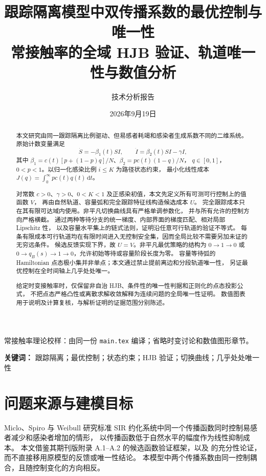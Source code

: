 \documentclass[11pt,a4paper,UTF8]{ctexart}
\title{\bfseries 跟踪隔离模型中双传播系数的最优控制与唯一性\\[2mm]
\large 常接触率的全域 HJB 验证、轨道唯一性与数值分析}
\author{技术分析报告}
\date{2026年9月19日}
\theoremstyle{definition}
\newcommand{\dd}{\,\mathrm d}
\begin{document}
\maketitle
\ifdefined\TheoryOnly
\begin{center}\small 常接触率理论校样：由同一份 \texttt{main.tex} 编译；省略时变讨论和数值图形章节。\end{center}
\fi
\begin{abstract}
本文研究由同一跟踪隔离比例驱动、但易感者耗竭和感染者生成系数不同的二维系统。
原始计数变量满足
\[
\dot S=-\beta_1(t)SI,\qquad \dot I=\beta_2(t)SI-\gamma I,
\]
其中 $\beta_1=c(t)[p+(1-p)q]/N$、$\beta_2=pc(t)(1-q)/N$，
$q\in[0,1]$，$0<p<1$。以归一化感染比例 $i\le K$ 为路径状态约束，
最小化线性成本 $J(q)=\int_0^\infty pc(t)q(t)\dd t$。

对常数 $c>0$、$\gamma>0$、$0<K<1$ 及正感染初值，本文先定义所有可测可行控制上的值函数 $V$，
再由自然轨道、容量弧和完全跟踪特征线构造候选成本 $U$。
完全跟踪成本只在其有限可达域内使用。非平凡切换曲线具有严格单调参数化，
并与所有允许的控制方向严格横截。
通过两种等待分支的统一梯度、内部界面的梯度匹配、相对局部 Lipschitz 性，
以及容量水平集上的链式法则，证明沿任意可行轨道的验证不等式。
每条有限成本可行轨道均在有限时间进入无控制安全集，因而全局比较不需要另加未证的无穷远条件。
候选反馈实现下界，故 $U=V$。非平凡最优策略的结构为
$0\to1\to0$ 或 $0\to q_B(s)\to1\to0$，允许初始等待或容量阶段长度为零。
容量等待弧的 Hamiltonian 点态极小集并非单点；本文通过禁止提前离边和分段轨道唯一性，
另证最优控制在全时间轴上几乎处处唯一。

给定时变接触率时，仅保留非自治 HJB、条件性的唯一性判据和正则化的点态投影公式，
不把点态严格凸性或离散求解收敛解释为连续问题的全局唯一性证明。
数值图表用于说明及计算复核，与解析证明的证据范围分别陈述。
\end{abstract}
\noindent\textbf{关键词：} 跟踪隔离；最优控制；状态约束；HJB 验证；切换曲线；几乎处处唯一性
\tableofcontents\newpage

\section{问题来源与建模目标}
\label{sec:model}
Miclo、Spiro 与 Weibull 研究标准 SIR 约化系统中同一个传播函数同时控制易感者减少和感染者增加的情形，
以传播函数低于自然水平的幅度作为线性抑制成本\citep{MicloSpiroWeibull2022}。
本文借鉴其期刊版附录 A.1--A.2 的候选函数验证框架，以及
\citet[\S5.1.4]{Liberzon2012} 的充分性论证，而不直接移用原模型的反馈或唯一性结论。
本模型中两个传播系数由同一控制耦合，且随控制变化的方向相反。
\end{document}
